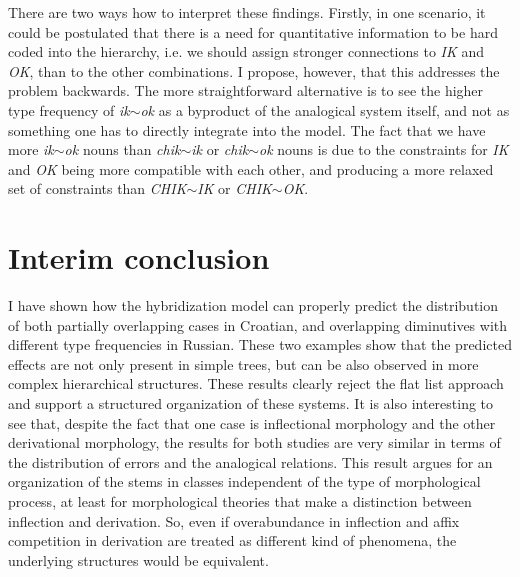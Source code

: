 There are two ways how to interpret these findings. Firstly, in one scenario, it could be postulated that there is a need for quantitative information to be hard coded into the hierarchy, i.e. we should assign stronger connections to \textit{IK} and \textit{OK}, than to the other combinations. I propose, however, that this addresses the problem backwards. The more straightforward alternative is to see the higher type frequency of \textit{ik$\sim$ok} as a byproduct of the analogical system itself, and not as something one has to directly integrate into the model. The fact that we have more \textit{ik$\sim$ok} nouns than \textit{chik$\sim$ik} or \textit{chik$\sim$ok} nouns is due to the constraints for \textit{IK} and \textit{OK} being more compatible with each other, and producing a more relaxed set of constraints than \textit{CHIK$\sim$IK} or \textit{CHIK$\sim$OK}.


\section{Interim conclusion}

I have shown how the hybridization model can properly predict the distribution of both partially overlapping cases in Croatian, and overlapping diminutives with different type frequencies in Russian. These two examples show that the predicted effects are not only present in simple trees, but can be also observed in more complex hierarchical structures. These results clearly reject the flat list approach and support a structured organization of these systems. It is also interesting to see that, despite the fact that one case is inflectional morphology and the other derivational morphology, the results for both studies are very similar in terms of the distribution of errors and the analogical relations. This result argues for an organization of the stems in classes independent of the type of morphological process, at least for morphological theories that make a distinction between inflection and derivation. So, even if overabundance in inflection and affix competition in derivation are treated as different kind of phenomena, the underlying structures would be equivalent.

